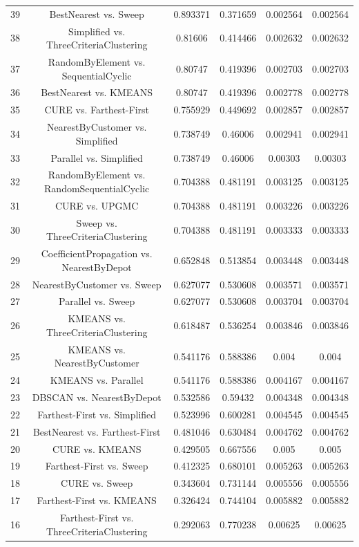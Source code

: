 \documentclass[a4paper,10pt]{article}
\begin{document}
\begin{landscape}
\begin{table}[!htp]
\begin{tabular}{cccccc}
39&BestNearest vs. Sweep&0.893371&0.371659&0.002564&0.002564\\
38&Simplified vs. ThreeCriteriaClustering&0.81606&0.414466&0.002632&0.002632\\
37&RandomByElement vs. SequentialCyclic&0.80747&0.419396&0.002703&0.002703\\
36&BestNearest vs. KMEANS&0.80747&0.419396&0.002778&0.002778\\
35&CURE vs. Farthest-First&0.755929&0.449692&0.002857&0.002857\\
34&NearestByCustomer vs. Simplified&0.738749&0.46006&0.002941&0.002941\\
33&Parallel vs. Simplified&0.738749&0.46006&0.00303&0.00303\\
32&RandomByElement vs. RandomSequentialCyclic&0.704388&0.481191&0.003125&0.003125\\
31&CURE vs. UPGMC&0.704388&0.481191&0.003226&0.003226\\
30&Sweep vs. ThreeCriteriaClustering&0.704388&0.481191&0.003333&0.003333\\
29&CoefficientPropagation vs. NearestByDepot&0.652848&0.513854&0.003448&0.003448\\
28&NearestByCustomer vs. Sweep&0.627077&0.530608&0.003571&0.003571\\
27&Parallel vs. Sweep&0.627077&0.530608&0.003704&0.003704\\
26&KMEANS vs. ThreeCriteriaClustering&0.618487&0.536254&0.003846&0.003846\\
25&KMEANS vs. NearestByCustomer&0.541176&0.588386&0.004&0.004\\
24&KMEANS vs. Parallel&0.541176&0.588386&0.004167&0.004167\\
23&DBSCAN vs. NearestByDepot&0.532586&0.59432&0.004348&0.004348\\
22&Farthest-First vs. Simplified&0.523996&0.600281&0.004545&0.004545\\
21&BestNearest vs. Farthest-First&0.481046&0.630484&0.004762&0.004762\\
20&CURE vs. KMEANS&0.429505&0.667556&0.005&0.005\\
19&Farthest-First vs. Sweep&0.412325&0.680101&0.005263&0.005263\\
18&CURE vs. Sweep&0.343604&0.731144&0.005556&0.005556\\
17&Farthest-First vs. KMEANS&0.326424&0.744104&0.005882&0.005882\\
16&Farthest-First vs. ThreeCriteriaClustering&0.292063&0.770238&0.00625&0.00625\\

\end{tabular}
\end{table}
\end{landscape}
\end{document}
